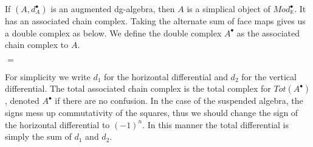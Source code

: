 \documentclass[../thesis.tex]{subfiles}
\begin{document}
            If $(A, d_A^\bullet)$ is an augmented dg-algebra, then $A$ is a simplical object of $Mod_\mathbb{K}^\bullet$. It has an associated chain complex. Taking the alternate sum of face maps gives us a double complex as below. We define the double complex $A^\bullet$ as the associated chain complex to $A$.
            \begin{center}
                $=$
            \end{center}
        
            For simplicity we write $d_1$ for the horizontal differential and $d_2$ for the vertical differential. The total associated chain complex is the total complex for $Tot(A^\bullet)$, denoted $A^\bullet$ if there are no confusion. In the case of the suspended algebra, the signs mess up commutativity of the squares, thus we should change the sign of the horizontal differential to $(-1)^n$. In this manner the total differential is simply the sum of $d_1$ and $d_2$.
\end{document}
